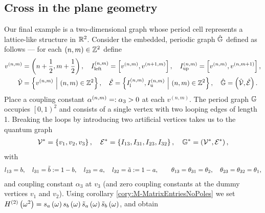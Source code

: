 \subsection{Cross in the plane geometry} \label{ssec:ExampleCrossInPlane}
Our final example is a two-dimensional graph whose period cell represents a lattice-like structure in $\mathbb{R}^2$.
Consider the embedded, periodic graph $\hat{\mathbb{G}}$ defined as follows --- for each $\left( n,m \right)\in\mathbb{Z}^2$ define
\begin{align*}
	v^{(n,m)} &= \left( n+\frac{1}{2}, m+\frac{1}{2} \right), \quad
	I_{\mathrm{left}}^{\left( n,m \right)} = \left[ v^{\left( n,m \right)}, v^{\left( n+1,m \right)} \right], \quad
	I_{\mathrm{up}}^{\left( n,m \right)} = \left[ v^{\left( n,m \right)}, v^{\left( n,m+1 \right)} \right], \\
	\hat{\mathcal{V}} &= \left\{ v^{\left( n,m \right)} \ \middle\vert \  \left( n,m \right)\in\mathbb{Z}^2 \right\}, \quad
	\hat{\mathcal{E}} = \left\{  I_{\mathrm{l}}^{\left( n,m \right)}, I_{\mathrm{u}}^{\left( n,m \right)} \ \middle\vert \  \left( n,m \right)\in\mathbb{Z}^2 \right\}, \quad
	\hat{\mathbb{G}} = \left( \hat{\mathcal{V}}, \hat{\mathcal{E}} \right).
\end{align*}
Place a coupling constant $\alpha^{\left( n,m \right)} =: \alpha_3>0$ at each $v^{(n,m)}$.
The period graph $\mathbb{G}$ occupies $\left[0,1\right)^2$ and consists of a single vertex with two looping edges of length 1.
Breaking the loops by introducing two artificial vertices takes us to the quantum graph
\begin{align*}
	\mathcal{V}^* = \left\{ v_1, v_2, v_3 \right\}, \quad
	\mathcal{E}^* = \left\{ I_{13}, I_{31}, I_{23}, I_{32} \right\}, \quad
	\mathbb{G}^* = \left( \mathcal{V}^*, \mathcal{E}^* \right),
\end{align*}
with
\begin{align*}
	l_{13} = b, \quad l_{31} = \tilde{b} := 1-b, \quad 
	l_{23} = a, \quad l_{32} = \tilde{a} := 1-a, \qquad
	\theta_{13} = \theta_{31} = \theta_2, \quad \theta_{23} = \theta_{32} = \theta_1,
\end{align*}
and coupling constant $\alpha_3$ at $v_3$ (and zero coupling constants at the dummy vertices $v_1$ and $v_2$).
Using corollary \ref{cory:M-MatrixEntriesNoPoles} we set $H^{(2)}\left( \omega^2 \right) = s_a\left( \omega \right) s_b\left( \omega \right) \tilde{s}_a\left( \omega \right) \tilde{s}_b\left( \omega \right)$, and obtain
